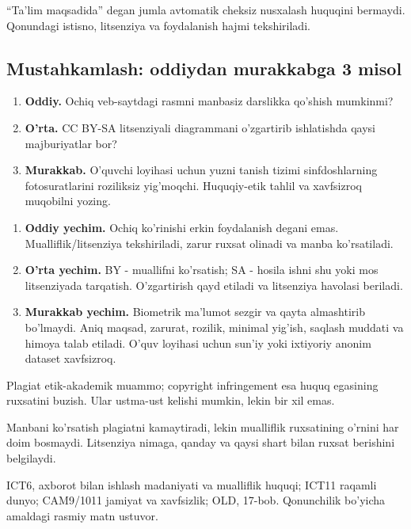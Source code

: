 \documentclass[11pt,a4paper,oneside]{book}
\begin{document}
\begin{attest}
``Ta'lim maqsadida'' degan jumla avtomatik cheksiz nusxalash huquqini bermaydi. Qonundagi istisno, litsenziya va foydalanish hajmi tekshiriladi.
\end{attest}

\subsection{Mustahkamlash: oddiydan murakkabga 3 misol}
\begin{taskbox}
\begin{enumerate}[leftmargin=7mm]
\item \textbf{Oddiy.} Ochiq veb-saytdagi rasmni manbasiz darslikka qo'shish mumkinmi?
\item \textbf{O'rta.} CC BY-SA litsenziyali diagrammani o'zgartirib ishlatishda qaysi majburiyatlar bor?
\item \textbf{Murakkab.} O'quvchi loyihasi uchun yuzni tanish tizimi sinfdoshlarning fotosuratlarini roziliksiz yig'moqchi. Huquqiy-etik tahlil va xavfsizroq muqobilni yozing.
\end{enumerate}
\end{taskbox}

\begin{solutionbox}
\begin{enumerate}[leftmargin=7mm]
\item \textbf{Oddiy yechim.} Ochiq ko'rinishi erkin foydalanish degani emas. Mualliflik/litsenziya tekshiriladi, zarur ruxsat olinadi va manba ko'rsatiladi.
\item \textbf{O'rta yechim.} BY - muallifni ko'rsatish; SA - hosila ishni shu yoki mos litsenziyada tarqatish. O'zgartirish qayd etiladi va litsenziya havolasi beriladi.
\item \textbf{Murakkab yechim.} Biometrik ma'lumot sezgir va qayta almashtirib bo'lmaydi. Aniq maqsad, zarurat, rozilik, minimal yig'ish, saqlash muddati va himoya talab etiladi. O'quv loyihasi uchun sun'iy yoki ixtiyoriy anonim dataset xavfsizroq.
\end{enumerate}
\end{solutionbox}
\begin{attest}Plagiat etik-akademik muammo; copyright infringement esa huquq egasining ruxsatini buzish. Ular ustma-ust kelishi mumkin, lekin bir xil emas.\end{attest}

\begin{summarybox}
Manbani ko'rsatish plagiatni kamaytiradi, lekin mualliflik ruxsatining o'rnini har doim bosmaydi. Litsenziya nimaga, qanday va qaysi shart bilan ruxsat berishini belgilaydi.
\end{summarybox}
\begin{sourcebox}
ICT6, axborot bilan ishlash madaniyati va mualliflik huquqi; ICT11 raqamli dunyo; CAM9/1011 jamiyat va xavfsizlik; OLD, 17-bob. Qonunchilik bo'yicha amaldagi rasmiy matn ustuvor.
\end{sourcebox}
\end{document}
